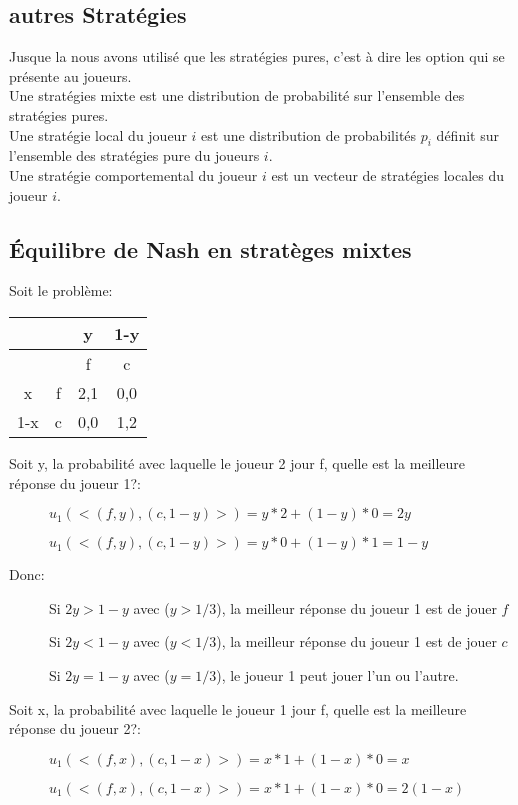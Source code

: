 \subsection{autres Stratégies}
Jusque la nous avons utilisé que les stratégies pures, c'est à dire les option qui se présente au joueurs.\\
Une stratégies mixte est une distribution de probabilité sur l'ensemble des stratégies pures.\\
Une stratégie local du joueur $i$ est une distribution de probabilités $p_i$ définit sur l'ensemble des stratégies pure du joueurs $i$.\\
Une stratégie comportemental du joueur $i$ est un vecteur de stratégies locales du joueur $i$.\\

\subsection{Équilibre de Nash en stratèges mixtes}
Soit le problème:
\begin{tabular}{cc|cc}
$ $ &$ $ & y & 1-y\\
\hline
$ $& $ $ & f & c\\
\hline
x & f & 2,1 & 0,0\\
1-x & c & 0,0 & 1,2\\
\end{tabular}

Soit y, la probabilité avec laquelle le joueur 2 jour f, quelle est la meilleure réponse du joueur 1?:
\begin{description}
\item[] $u_1(<(f, y), (c, 1-y)>) = y*2 + (1-y)*0 = 2y$
\item[] $u_1(<(f, y), (c, 1-y)>) = y*0 + (1-y)*1 = 1-y$
\end{description}

Donc:
\begin{description}
\item[] Si $2y > 1 - y$ avec ($y > 1/3$), la meilleur réponse du joueur 1 est de jouer $f$
\item[] Si $2y < 1 - y$ avec ($y < 1/3$), la meilleur réponse du joueur 1 est de jouer $c$
\item[] Si $2y = 1 - y$ avec ($y = 1/3$), le joueur 1 peut jouer l'un ou l'autre.
\end{description}

Soit x, la probabilité avec laquelle le joueur 1 jour f, quelle est la meilleure réponse du joueur 2?:
\begin{description}
\item[] $u_1(<(f, x), (c, 1-x)>) = x*1+(1-x)*0 = x$
\item[] $u_1(<(f, x), (c, 1-x)>) = x*1+(1-x)*0 = 2(1-x)$
\end{description}

